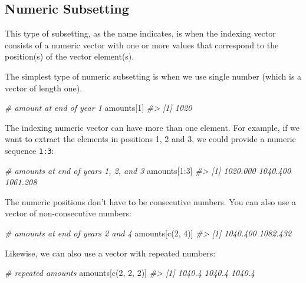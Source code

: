 \documentclass[
]{book}
\newenvironment{Shaded}{\begin{snugshade}}{\end{snugshade}}
\newcommand{\CommentTok}[1]{\textcolor[rgb]{0.56,0.35,0.01}{\textit{#1}}}
\newcommand{\DecValTok}[1]{\textcolor[rgb]{0.00,0.00,0.81}{#1}}
\newcommand{\FunctionTok}[1]{\textcolor[rgb]{0.00,0.00,0.00}{#1}}
\newcommand{\NormalTok}[1]{#1}
\newcommand{\SpecialCharTok}[1]{\textcolor[rgb]{0.00,0.00,0.00}{#1}}
\begin{document}
\hypertarget{numeric-subsetting}{%
\subsection{Numeric Subsetting}\label{numeric-subsetting}}

This type of subsetting, as the name indicates, is when the indexing vector
consists of a numeric vector with one or more values that correspond to the position(s) of the vector element(s).

The simplest type of numeric subsetting is when we use single number (which is
a vector of length one).

\begin{Shaded}
\begin{Highlighting}[]
\CommentTok{\# amount at end of year 1}
\NormalTok{amounts[}\DecValTok{1}\NormalTok{]}
\CommentTok{\#\textgreater{} [1] 1020}
\end{Highlighting}
\end{Shaded}

The indexing numeric vector can have more than one element. For example, if
we want to extract the elements in positions 1, 2 and 3, we could provide a
numeric sequence \texttt{1:3}:

\begin{Shaded}
\begin{Highlighting}[]
\CommentTok{\# amounts at end of years 1, 2, and 3}
\NormalTok{amounts[}\DecValTok{1}\SpecialCharTok{:}\DecValTok{3}\NormalTok{]}
\CommentTok{\#\textgreater{} [1] 1020.000 1040.400 1061.208}
\end{Highlighting}
\end{Shaded}

The numeric positions don't have to be consecutive numbers. You can also use
a vector of non-consecutive numbers:

\begin{Shaded}
\begin{Highlighting}[]
\CommentTok{\# amounts at end of years 2 and 4}
\NormalTok{amounts[}\FunctionTok{c}\NormalTok{(}\DecValTok{2}\NormalTok{, }\DecValTok{4}\NormalTok{)]}
\CommentTok{\#\textgreater{} [1] 1040.400 1082.432}
\end{Highlighting}
\end{Shaded}

Likewise, we can also use a vector with repeated numbers:

\begin{Shaded}
\begin{Highlighting}[]
\CommentTok{\# repeated amounts}
\NormalTok{amounts[}\FunctionTok{c}\NormalTok{(}\DecValTok{2}\NormalTok{, }\DecValTok{2}\NormalTok{, }\DecValTok{2}\NormalTok{)]}
\CommentTok{\#\textgreater{} [1] 1040.4 1040.4 1040.4}
\end{Highlighting}
\end{Shaded}
\end{document}
